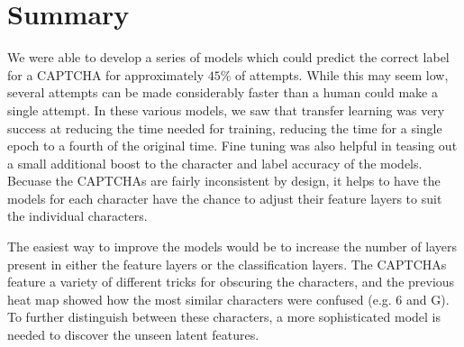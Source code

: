 \documentclass[12pt]{article}
\begin{document}
\section*{Summary}


We were able to develop a series of models which could predict the correct label
for a CAPTCHA for approximately $45\%$ of attempts. While this may seem low,
several attempts can be made considerably faster than a human could make a
single attempt. In these various models, we saw that transfer learning was very
success at reducing the time needed for training, reducing the time for a single
epoch to a fourth of the original time. Fine tuning was also helpful in teasing
out a small additional boost to the character and label accuracy of the models.
Becuase the CAPTCHAs are fairly inconsistent by design, it helps to have the
models for each character have the chance to adjust their feature layers to suit
the individual characters.


The easiest way to improve the models would be to increase the number of layers 
present in either the feature layers or the classification layers. The CAPTCHAs 
feature a variety of different tricks for obscuring the characters, and the 
previous heat map showed how the most similar characters were confused (e.g. 6 
and G). To further distinguish between these characters, a more sophisticated 
model is needed to discover the unseen latent features.
\end{document}
